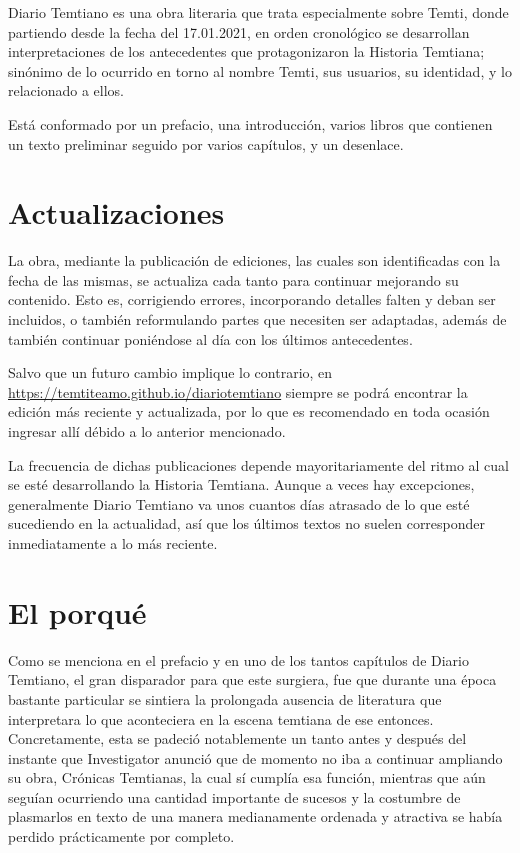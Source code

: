 \documentclass[
]{book}
\begin{document}
Diario Temtiano es una obra literaria que trata especialmente sobre Temti, donde partiendo desde la fecha del 17.01.2021, en orden cronológico se desarrollan interpretaciones de los antecedentes que protagonizaron la Historia Temtiana; sinónimo de lo ocurrido en torno al nombre Temti, sus usuarios, su identidad, y lo relacionado a ellos.

Está conformado por un prefacio, una introducción, varios libros que contienen un texto preliminar seguido por varios capítulos, y un desenlace.

\hypertarget{actualizaciones}{%
\section*{Actualizaciones}\label{actualizaciones}}

La obra, mediante la publicación de ediciones, las cuales son identificadas con la fecha de las mismas, se actualiza cada tanto para continuar mejorando su contenido. Esto es, corrigiendo errores, incorporando detalles falten y deban ser incluidos, o también reformulando partes que necesiten ser adaptadas, además de también continuar poniéndose al día con los últimos antecedentes.

Salvo que un futuro cambio implique lo contrario, en \url{https://temtiteamo.github.io/diariotemtiano} siempre se podrá encontrar la edición más reciente y actualizada, por lo que es recomendado en toda ocasión ingresar allí débido a lo anterior mencionado.

La frecuencia de dichas publicaciones depende mayoritariamente del ritmo al cual se esté desarrollando la Historia Temtiana. Aunque a veces hay excepciones, generalmente Diario Temtiano va unos cuantos días atrasado de lo que esté sucediendo en la actualidad, así que los últimos textos no suelen corresponder inmediatamente a lo más reciente.

\hypertarget{el-porquuxe9}{%
\section*{El porqué}\label{el-porquuxe9}}

Como se menciona en el prefacio y en uno de los tantos capítulos de Diario Temtiano, el gran disparador para que este surgiera, fue que durante una época bastante particular se sintiera la prolongada ausencia de literatura que interpretara lo que aconteciera en la escena temtiana de ese entonces. Concretamente, esta se padeció notablemente un tanto antes y después del instante que Investigator anunció que de momento no iba a continuar ampliando su obra, Crónicas Temtianas, la cual sí cumplía esa función, mientras que aún seguían ocurriendo una cantidad importante de sucesos y la costumbre de plasmarlos en texto de una manera medianamente ordenada y atractiva se había perdido prácticamente por completo.
\end{document}
